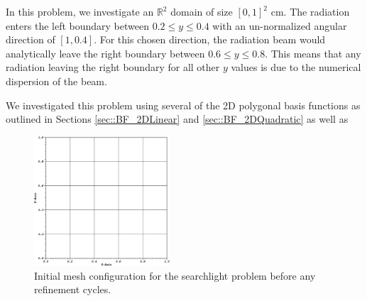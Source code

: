 In this problem, we investigate an $\mathbb{R}^2$ domain of size $[0,1]^2$ cm. The radiation enters the left boundary between $0.2 \leq y \leq 0.4$ with an un-normalized angular direction of $[1,0.4]$. For this chosen direction, the radiation beam would analytically leave the right boundary between $0.6 \leq y \leq 0.8$. This means that any radiation leaving the right boundary for all other $y$ values is due to the numerical dispersion of the beam.

We investigated this problem using several of the 2D polygonal basis functions as outlined in Sections \ref{sec::BF_2DLinear} and \ref{sec::BF_2DQuadratic} as well as 

\begin{figure}
\centering
\includegraphics[width=0.45\textwidth]{figures/sec_BF/searchlight_starting_mesh.eps}
\caption{Initial mesh configuration for the searchlight problem before any refinement cycles.}
\label{fig::BF_Results_SL_starting_mesh}
\end{figure}

